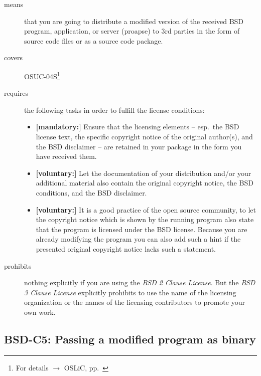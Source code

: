 \begin{description}
\item[means] that you are going to distribute a modified version of the received
BSD program, application, or server (proapse) to 3rd parties in the form of
source code files or as a source code package.
\item[covers] OSUC-04S\footnote{For details $\rightarrow$ OSLiC, pp.\
\pageref{OSUC-04S-DEF}}

\item[requires] the following tasks in order to fulfill the license conditions:
\begin{itemize}
  \item \textbf{[mandatory:]} Ensure that the licensing elements -- esp.\
  the BSD license text, the specific copyright notice of the original author(s),
  and the BSD disclaimer -- are retained in your package in the form you have
  received them.
  
  \item \textbf{[voluntary:]} Let the documentation of your distribution and/or
  your additional material also contain the original copyright notice, the BSD
  conditions, and the BSD disclaimer.
  
  \item \textbf{[voluntary:]} It is a good practice of the open source
  community, to let the copyright notice which is shown by the running program
  also state that the program is licensed under the BSD license. Because you are
  already modifying the program you can also add such a hint if the presented
  original copyright notice lacks such a statement.
\end{itemize}

\item[prohibits] nothing explicitly if you are using the \emph{BSD 2 Clause
License}. But the \emph{BSD 3 Clause License} explicitly prohibits to use the
name of the licensing organization or the names of the licensing contributors to
promote your own work.

\end{description}

\subsection{BSD-C5: Passing a modified program as binary}
\label{OSUC-04B-BSD}

